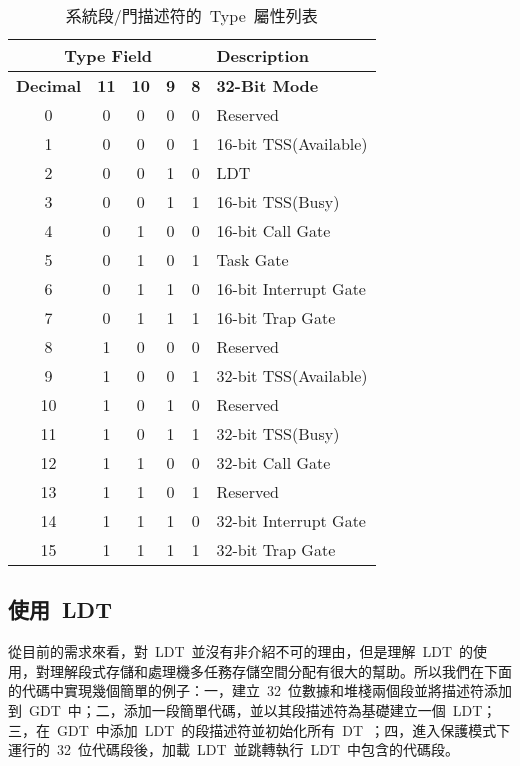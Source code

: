 \begin{itemize}
\begin{center}\begin{longtable}{c|c|c|c|c|l}
\caption[]{系統段/門描述符的~Type~屬性列表}\label{sys_gate_types}\\
\hline
\multicolumn{5}{c|}{\textbf{Type Field}} & \textbf{Description}\bigstrut\\
\hline
\textbf{Decimal} & \textbf{11} & \textbf{10} & \textbf{9} & \textbf{8} & \textbf{32-Bit Mode}\\
\hline
0 & 0 & 0 & 0 & 0 & Reserved\\
1 & 0 & 0 & 0 & 1 & 16-bit TSS(Available)\\
2 & 0 & 0 & 1 & 0 & LDT\\
3 & 0 & 0 & 1 & 1 & 16-bit TSS(Busy)\\
4 & 0 & 1 & 0 & 0 & 16-bit Call Gate\\
5 & 0 & 1 & 0 & 1 & Task Gate\\
6 & 0 & 1 & 1 & 0 & 16-bit Interrupt Gate\\
7 & 0 & 1 & 1 & 1 & 16-bit Trap Gate\\
8 & 1 & 0 & 0 & 0 & Reserved\\
9 & 1 & 0 & 0 & 1 & 32-bit TSS(Available)\\
10 & 1 & 0 & 1 & 0 & Reserved\\
11 & 1 & 0 & 1 & 1 & 32-bit TSS(Busy)\\
12 & 1 & 1 & 0 & 0 & 32-bit Call Gate\\
13 & 1 & 1 & 0 & 1 & Reserved\\
14 & 1 & 1 & 1 & 0 & 32-bit Interrupt Gate\\
15 & 1 & 1 & 1 & 1 & 32-bit Trap Gate\\
\hline
\end{longtable}\end{center}

\end{itemize}

\subsection{使用~LDT~}

從目前的需求來看，對~LDT~並沒有非介紹不可的理由，但是理解~LDT~的使用，對理解段式存儲和處理機多任務存儲空間分配有很大的幫助。所以我們在下面的代碼中實現幾個簡單的例子：一，建立~32~位數據和堆棧兩個段並將描述符添加到~GDT~中；二，添加一段簡單代碼，並以其段描述符為基礎建立一個~LDT；三，在~GDT~中添加~LDT~的段描述符並初始化所有~DT~；四，進入保護模式下運行的~32~位代碼段後，加載~LDT~並跳轉執行~LDT~中包含的代碼段。

